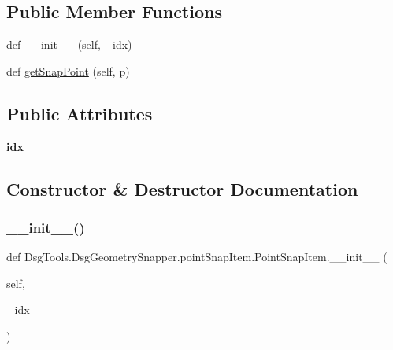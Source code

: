 \subsection*{Public Member Functions}
\begin{DoxyCompactItemize}
\item 
def \mbox{\hyperlink{class_dsg_tools_1_1_dsg_geometry_snapper_1_1point_snap_item_1_1_point_snap_item_a5378513f1e101b90a03364346924cff7}{\+\_\+\+\_\+init\+\_\+\+\_\+}} (self, \+\_\+idx)
\item 
def \mbox{\hyperlink{class_dsg_tools_1_1_dsg_geometry_snapper_1_1point_snap_item_1_1_point_snap_item_a1c877e5932e883d3349cc092090ed84c}{get\+Snap\+Point}} (self, p)
\end{DoxyCompactItemize}
\subsection*{Public Attributes}
\begin{DoxyCompactItemize}
\item 
\mbox{\label{class_dsg_tools_1_1_dsg_geometry_snapper_1_1point_snap_item_1_1_point_snap_item_a0d895e37127d252a97bed25e6bf6e878}} 
{\bfseries idx}
\end{DoxyCompactItemize}


\subsection{Constructor \& Destructor Documentation}
\mbox{\label{class_dsg_tools_1_1_dsg_geometry_snapper_1_1point_snap_item_1_1_point_snap_item_a5378513f1e101b90a03364346924cff7}} 
\subsubsection{\texorpdfstring{\+\_\+\+\_\+init\+\_\+\+\_\+()}{\_\_init\_\_()}}
{\footnotesize\ttfamily def Dsg\+Tools.\+Dsg\+Geometry\+Snapper.\+point\+Snap\+Item.\+Point\+Snap\+Item.\+\_\+\+\_\+init\+\_\+\+\_\+ (\begin{DoxyParamCaption}\item[{}]{self,  }\item[{}]{\+\_\+idx }\end{DoxyParamCaption})}


